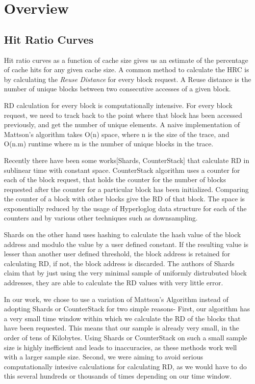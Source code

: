 \section{Overview}

\subsection{Hit Ratio Curves}

Hit ratio curves as a function of cache size gives us an estimate of the percentage of cache hits for any given cache size. A common method to calculate the HRC is by calculating the \emph{Reuse Distance} for every block request. A Reuse distance is the number of unique blocks between two consecutive accesses of a given block.

RD calculation for every block is computationally intensive. For every block request, we need to track back to the point where that block has been accessed previously, and get the number of unique elements. A naive implementation of Mattson's algorithm takes O(n) space, where n is the size of the trace, and O(n.m) runtime where m is the number of unique blocks in the trace.

Recently there have been some works[Shards, CounterStack] that calculate RD in sublinear time with constant space. CounterStack algorithm uses a counter for each of the block request, that holds the counter for the number of blocks requested after the counter for a particular block has been initialized. Comparing the counter of a block with other blocks give the RD of that block. The space is exponentially reduced by the usage of Hyperloglog data structure for each of the counters and by various other techniques such as downsampling.

Shards on the other hand uses hashing to calculate the hash value of the block address and modulo the value by a user defined constant. If the resulting value is lesser than another user defined threshold, the block address is retained for calculating RD, if not, the block address is discarded. The authors of Shards claim that by just using the very minimal sample of uniformly distrubuted block addresses, they are able to calculate the RD values with very little error.

In our work, we chose to use a variation of Mattson's Algorithm instead of adopting Shards or CounterStack for two simple reasons- First, our algorithm has a very small time window within which we calculate the RD of the blocks that have been requested. This means that our sample is already very small, in the order of tens of Kilobytes. Using Shards or CounterStack on such a small sample size is highly inefficient and leads to inaccuracies, as these methods work well with a larger sample size. Second, we were aiming to avoid serious computationally intesive calculations for calculating RD, as we would have to do this several hundreds or thousands of times depending on our time window.

